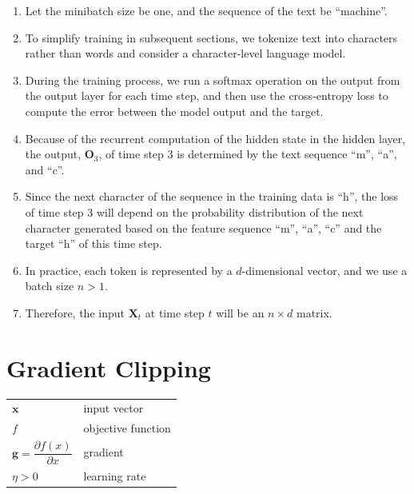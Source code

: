 \begin{enumerate}
    \item Let the minibatch size be one, and the sequence of the text be “machine”.
    
    \item To simplify training in subsequent sections, we tokenize text into characters rather than words and consider a character-level language model.

    \item During the training process, we run a softmax operation on the output from the output layer for each time step, and then use the cross-entropy loss to compute the error between the model output and the target. 
    
    \item Because of the recurrent computation of the hidden state in the hidden layer, the output, $\mathbf{O}_3$, of time step 3 is determined by the text sequence “m”, “a”, and “c”. 
    
    \item Since the next character of the sequence in the training data is “h”, the loss of time step 3 will depend on the probability distribution of the next character generated based on the feature sequence “m”, “a”, “c” and the target “h” of this time step.

    \item In practice, each token is represented by a $d$-dimensional vector, and we use a batch size $n>1$.
    
    \item Therefore, the input $\mathbf X_t$ at time step $t$ will be an $n\times d$ matrix.
\end{enumerate}


\section{Gradient Clipping \cite{dnn-1}} \label{Gradient Clipping}

\begin{customTableWrapper}{1.5}
\begin{longtable}{l p{8cm}}
    $\mathbf{x}$ & input vector \\
    $f$ & objective function \\
    $\mathbf{g} = \dfrac{\partial f(x)}{\partial x}$ & gradient \\
    $\eta > 0$ & learning rate \\
\end{longtable}
\end{customTableWrapper}

